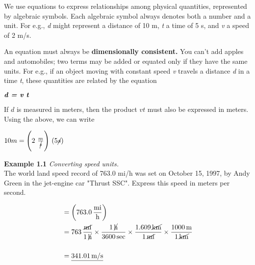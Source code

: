 We use equations to express relationships among physical quantities, represented by algebraic symbols. Each algebraic symbol always denotes both a number and a unit. For e.g., \textit{d} might represent a distance of 10 m, \textit{t} a time of 5 s, and \textit{v} a speed of 2 m/s.
\vspace{-20pt}

\begin{tipbox}
An equation must always be \textbf{dimensionally consistent.} You can't add apples and automobiles; two terms may be added or equated only if they have the same units. For e.g., if an object moving with constant speed \textit{v} travels a distance \textit{d} in a time \textit{t}, these quantities are related by the equation\\
\begin{center}
	$\textbf{\textit{{d = v t}}}$
\end{center}
\end{tipbox}
\vspace{-30pt}
If $d$ is measured in meters, then the product $v t$ must also be expressed in meters. Using the above, we can write
\vspace{-21pt}
\begin{mathbox}
\begin{center}
$10 m = \Biggl(2  \ \frac{m} {\cancel{s}} \Biggr)\ (5 \cancel{s}) $
\end{center}
\end{mathbox}
\vspace{-20pt}

\begin{examplebox}
\textbf{Example 1.1} \textit{Converting speed units.}\\

The world land speed record of 763.0 mi/h was set on October 15, 1997, by Andy Green in the jet-engine car "Thrust SSC". Express this speed in meters per second.
\begin{mathbox}
\begin{align*}
&= \left(763.0 \, \frac{\text{mi}}{\text{h}}\right) \\
&= 763 \, \frac{\text{\cancel{mi}}}{1 \, \text{\cancel{h}}} \times \frac{1 \, \text{\cancel{h}}}{3600 \, \text{sec}} \times \frac{1.609 \, \text{\cancel{km}}}{1 \, \text{\cancel{mi}}} \times \frac{1000 \, \text{m}}{1 \, \text{\cancel{km}}} \\ \\
&= \underline{341.01 \, \text{m/s}}
\end{align*}
\end{mathbox}
\end{examplebox}
\bigskip

